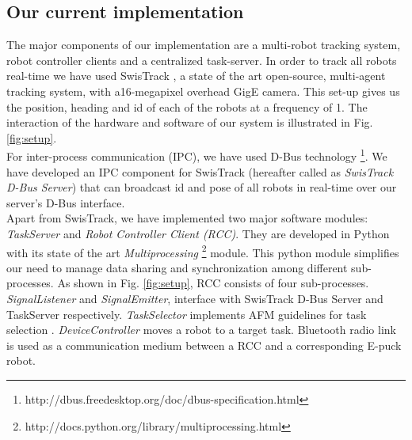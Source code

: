 \documentclass{llncs}
\begin{document}
\subsection{Our current implementation}
The major components of our implementation are a multi-robot tracking system, robot controller clients and a centralized task-server. In order to track all robots real-time we have used SwisTrack \cite{SwisTrack}, a state of the art open-source, multi-agent tracking system, with a16-megapixel overhead GigE camera. This set-up gives us the position, heading and id of each of the robots at a frequency of 1. The interaction of the hardware and software of our system is illustrated in Fig. \ref{fig:setup}. \\
For inter-process communication (IPC), we have used D-Bus technology \footnote{http://dbus.freedesktop.org/doc/dbus-specification.html}. We have developed an IPC component for SwisTrack (hereafter called as \textit{SwisTrack D-Bus Server}) that can broadcast id and pose of all robots in real-time over our server's D-Bus interface.\\
Apart from SwisTrack, we have implemented two major software modules: {\em TaskServer} and {\em Robot Controller Client (RCC)}. They are developed in Python with its state of the art \textit{Multiprocessing} \footnote{http://docs.python.org/library/multiprocessing.html} module. This python module simplifies our need to manage data sharing and synchronization among different sub-processes. As shown in Fig. \ref{fig:setup}, RCC consists of four sub-processes. {\em SignalListener} and {\em SignalEmitter}, interface with SwisTrack D-Bus Server and TaskServer respectively. {\em TaskSelector} implements AFM guidelines for task selection . {\em DeviceController} moves a robot to a target task. Bluetooth radio link is used as a communication medium between a RCC and a corresponding E-puck robot. 
\end{document}
